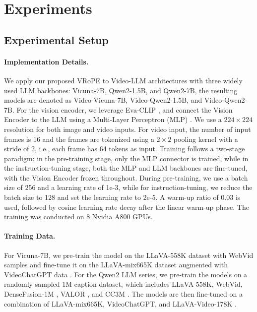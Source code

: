 \documentclass[11pt]{article}
\newcommand{\methodname}{VRoPE\xspace}
\begin{document}
\section{Experiments}

\subsection{Experimental Setup}

\paragraph{Implementation Details.} 
We apply our proposed \methodname to Video-LLM architectures with three widely used LLM backbones: Vicuna-7B, Qwen2-1.5B, and Qwen2-7B, the resulting models are denoted as Video-Vicuna-7B, Video-Qwen2-1.5B, and Video-Qwen2-7B. For the vision encoder, we leverage Eva-CLIP \cite{sun2023eva}, and connect the Vision Encoder to the LLM using a Multi-Layer Perceptron (MLP) \cite{tolstikhin2021mlp}. We use a $224 \times 224$ resolution for both image and video inputs. For video input, the number of input frames is 16 and the frames are tokenized using a $2 \times 2$ pooling kernel with a stride of 2, i.e., each frame has 64 tokens as input. Training follows a two-stage paradigm: in the pre-training stage, only the MLP connector is trained, while in the instruction-tuning stage, both the MLP and LLM backbones are fine-tuned, with the Vision Encoder frozen throughout.
During pre-training, we use a batch size of 256 and a learning rate of 1e-3, while for instruction-tuning, we reduce the batch size to 128 and set the learning rate to 2e-5. A warm-up ratio of 0.03 is used, followed by cosine learning rate decay after the linear warm-up phase. The training was conducted on 8 Nvidia A800 GPUs.

\paragraph{Training Data.}
For Vicuna-7B, we pre-train the model on the LLaVA-558K dataset \cite{liu2024visual} with WebVid samples \cite{bain2021frozen} and fine-tune it on the LLaVA-mix665K \cite{liu2024visual} dataset augmented with VideoChatGPT data \cite{maaz2023video}. 
For the Qwen2 LLM series, we pre-train the models on a randomly sampled 1M caption dataset, which includes LLaVA-558K, WebVid, DenseFusion-1M \cite{li2024densefusion}, VALOR \cite{liu2024valor}, and CC3M \cite{changpinyo2021conceptual}. The models are then fine-tuned on a combination of LLaVA-mix665K, VideoChatGPT, and LLaVA-Video-178K \cite{zhang2024video}.
\end{document}
